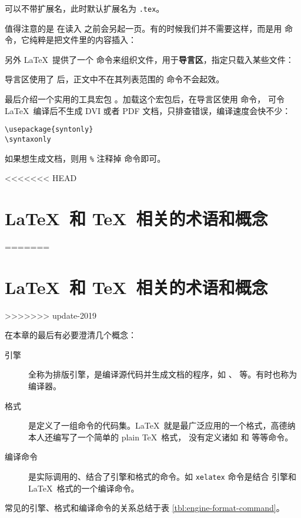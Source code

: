  可以不带扩展名，此时默认扩展名为 \texttt{.tex}。

值得注意的是  在读入  之前会另起一页。有的时候我们并不需要这样，而是用  命令，它纯粹是把文件里的内容插入：
\begin{command}
\end{command}

另外 \LaTeX\ 提供了一个  命令来组织文件，用于\textbf{导言区}，指定只载入某些文件：
\begin{command}
\end{command}

导言区使用了  后，正文中不在其列表范围的  命令不会起效。

最后介绍一个实用的工具宏包 。加载这个宏包后，在导言区使用  命令，
可令 \LaTeX\ 编译后不生成 DVI 或者 PDF 文档，只排查错误，编译速度会快不少：
\begin{verbatim}
\usepackage{syntonly}
\syntaxonly
\end{verbatim}

如果想生成文档，则用 \texttt\% 注释掉  命令即可。

<<<<<<< HEAD
\section{\LaTeX\ 和 \TeX\ 相关的术语和概念}\label{subsec:concepts}
=======
\section{\LaTeX\ 和 \TeX\ 相关的术语和概念}\label{sec:concepts}
>>>>>>> update-2019

在本章的最后有必要澄清几个概念：
\begin{description}
  \item[引擎] 全称为排版引擎，是编译源代码并生成文档的程序，如 、 等。有时也称为编译器。
  \item[格式] 是定义了一组命令的代码集。\LaTeX\ 就是最广泛应用的一个格式，高德纳本人还编写了一个简单的 plain \TeX\ 格式，
  没有定义诸如  和  等等命令。
  \item[编译命令] 是实际调用的、结合了引擎和格式的命令。如 \texttt{xelatex} 命令是结合 
  引擎和 \LaTeX\ 格式的一个编译命令。
\end{description}
常见的引擎、格式和编译命令的关系总结于表 \ref{tbl:engine-format-command}。

